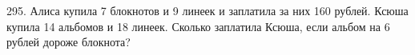 295. Алиса купила 7 блокнотов и 9 линеек и заплатила за них 160 рублей. Ксюша купила 14 альбомов и 18 линеек. Сколько заплатила Ксюша, если альбом на 6 рублей дороже блокнота?\\
